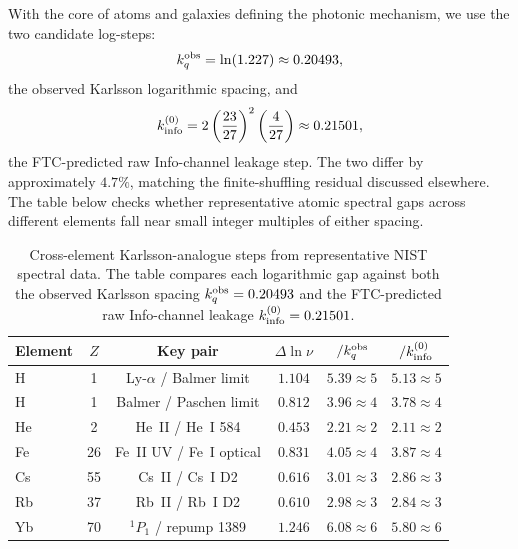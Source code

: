 \documentclass[11pt,a4paper]{article}
\begin{document}
    With the core of atoms and galaxies defining the photonic mechanism, we use the two candidate log-steps:
    \[
    k_q^{\rm obs}=\ln(1.227)\approx0.20493,
    \]
    the observed Karlsson logarithmic spacing, and
    \[
    k_{\rm info}^{(0)}
    =
    2\left(\frac{23}{27}\right)^2
    \left(\frac{4}{27}\right)
    \approx0.21501,
    \]
    the FTC-predicted raw Info-channel leakage step. The two differ by approximately \(4.7\%\), matching the finite-shuffling residual discussed elsewhere. The table below checks whether representative atomic spectral gaps across different elements fall near small integer multiples of either spacing.

    \begin{table}[H]
    \centering\small
    \begin{tabular}{|l|c|c|c|c|c|}
    \hline
    \textbf{Element} & $Z$ & \textbf{Key pair} & \textbf{$\Delta\ln\nu$}
      & \textbf{$/k_q^{\rm obs}$} & \textbf{$/k_{\rm info}^{(0)}$} \\
    \hline
    H  & 1  & Ly-$\alpha$ / Balmer limit & $1.104$ & $5.39\approx5$ & $5.13\approx5$ \\
    H  & 1  & Balmer / Paschen limit      & $0.812$ & $3.96\approx4$ & $3.78\approx4$ \\
    He & 2  & He~II / He~I 584            & $0.453$ & $2.21\approx2$ & $2.11\approx2$ \\
    Fe & 26 & Fe~II UV / Fe~I optical     & $0.831$ & $4.05\approx4$ & $3.87\approx4$ \\
    Cs & 55 & Cs~II / Cs~I D2             & $0.616$ & $3.01\approx3$ & $2.86\approx3$ \\
    Rb & 37 & Rb~II / Rb~I D2             & $0.610$ & $2.98\approx3$ & $2.84\approx3$ \\
    Yb & 70 & $^1P_1$ / repump 1389       & $1.246$ & $6.08\approx6$ & $5.80\approx6$ \\
    \hline
    \end{tabular}
    \caption{Cross-element Karlsson-analogue steps from representative NIST spectral data. The table compares each logarithmic gap against both the observed Karlsson spacing \(k_q^{\rm obs}=0.20493\) and the FTC-predicted raw Info-channel leakage \(k_{\rm info}^{(0)}=0.21501\).}
    \end{table}


\end{document}

